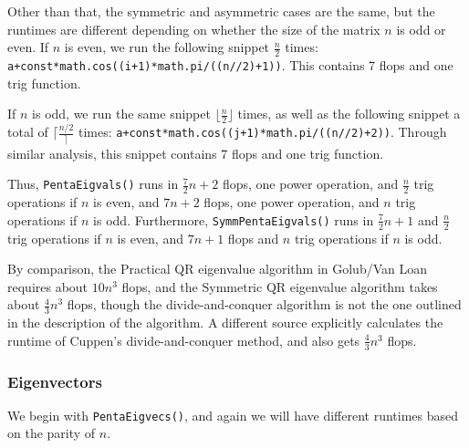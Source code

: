 \documentclass[10pt,twocolumn]{article}
\begin{document}
Other than that, the symmetric and asymmetric cases are the same, but the runtimes are different depending on whether the size of the matrix $n$ is odd or even. If $n$ is even, we run the following snippet $\frac{n}{2}$ times: \verb|a+const*math.cos((i+1)*math.pi/((n//2)+1))|. This contains 7 flops and one trig function.

If $n$ is odd, we run the same snippet $\lfloor\frac{n}{2}\rfloor$ times, as well as the following snippet a total of $\lceil\frac{n/2}\rceil$ times: \verb|a+const*math.cos((j+1)*math.pi/((n//2)+2))|. Through similar analysis, this snippet contains 7 flops and one trig function.

Thus, \verb|PentaEigvals()| runs in $\frac{7}{2}n+2$ flops, one power operation, and $\frac{n}{2}$ trig operations if $n$ is even, and $7n+2$ flops, one power operation, and $n$ trig operations if $n$ is odd. Furthermore, \verb|SymmPentaEigvals()| runs in $\frac{7}{2}n+1$ and $\frac{n}{2}$ trig operations if $n$ is even, and $7n+1$ flops and $n$ trig operations if $n$ is odd.

By comparison, the Practical QR eigenvalue algorithm in Golub/Van Loan requires about $10n^3$ flops, and the Symmetric QR eigenvalue algorithm takes about $\frac{4}{3}n^3$ flops, though the divide-and-conquer algorithm is not the one outlined in the description of the algorithm. A different source\cite{Arbenz_2018} explicitly calculates the runtime of Cuppen's divide-and-conquer method, and also gets $\frac{4}{3}n^3$ flops.

\subsubsection{Eigenvectors}

We begin with \verb|PentaEigvecs()|, and again we will have different runtimes based on the parity of $n$. 
\end{document}
